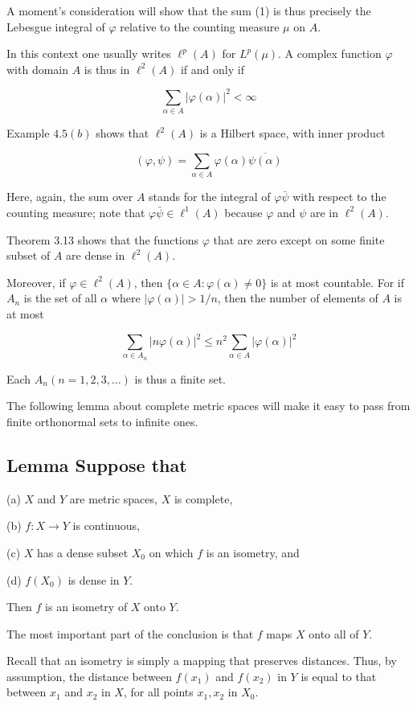 \documentclass[10pt]{article}
\begin{document}
A moment's consideration will show that the sum (1) is thus precisely the Lebesgue integral of $\varphi$ relative to the counting measure $\mu$ on $A$.

In this context one usually writes $\ell^{p}(A)$ for $L^{p}(\mu)$. A complex function $\varphi$ with domain $A$ is thus in $\ell^{2}(A)$ if and only if

$$
\sum_{\alpha \in A}|\varphi(\alpha)|^{2}<\infty
$$

Example $4.5(b)$ shows that $\ell^{2}(A)$ is a Hilbert space, with inner product

$$
(\varphi, \psi)=\sum_{\alpha \in A} \varphi(\alpha) \overline{\psi(\alpha)}
$$

Here, again, the sum over $A$ stands for the integral of $\varphi \bar{\psi}$ with respect to the counting measure; note that $\varphi \bar{\psi} \in \ell^{1}(A)$ because $\varphi$ and $\psi$ are in $\ell^{2}(A)$.

Theorem 3.13 shows that the functions $\varphi$ that are zero except on some finite subset of $A$ are dense in $\ell^{2}(A)$.

Moreover, if $\varphi \in \ell^{2}(A)$, then $\{\alpha \in A: \varphi(\alpha) \neq 0\}$ is at most countable. For if $A_{n}$ is the set of all $\alpha$ where $|\varphi(\alpha)|>1 / n$, then the number of elements of $A$ is at most

$$
\sum_{\alpha \in A_{n}}|n \varphi(\alpha)|^{2} \leq n^{2} \sum_{\alpha \in A}|\varphi(\alpha)|^{2}
$$

Each $A_{n}(n=1,2,3, \ldots)$ is thus a finite set.

The following lemma about complete metric spaces will make it easy to pass from finite orthonormal sets to infinite ones.

\subsection{Lemma Suppose that}
(a) $X$ and $Y$ are metric spaces, $X$ is complete,

(b) $f: X \rightarrow Y$ is continuous,

(c) $X$ has a dense subset $X_{0}$ on which $f$ is an isometry, and

(d) $f\left(X_{0}\right)$ is dense in $Y$.

Then $f$ is an isometry of $X$ onto $Y$.

The most important part of the conclusion is that $f$ maps $X$ onto all of $Y$.

Recall that an isometry is simply a mapping that preserves distances. Thus, by assumption, the distance between $f\left(x_{1}\right)$ and $f\left(x_{2}\right)$ in $Y$ is equal to that between $x_{1}$ and $x_{2}$ in $X$, for all points $x_{1}, x_{2}$ in $X_{0}$.
\end{document}
